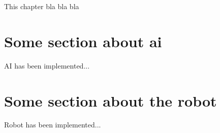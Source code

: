 \label{chapter:approach}

This chapter bla bla bla

\section{Some section about ai}
\label{section:approach_ai}

AI has been implemented...


\section{Some section about the robot}
\label{section:approach_robot}

Robot has been implemented...

\clearpage

